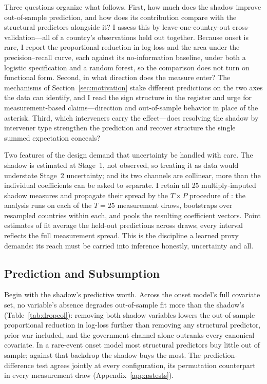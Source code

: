 Three questions organize what follows.  First, how much does the shadow
improve out-of-sample prediction, and how does its contribution compare with
the structural predictors alongside it?  I assess this by leave-one-country-out
cross-validation---all of a country's observations held out
together.  Because onset is rare, I
report the proportional reduction in log-loss and the area under the
precision--recall curve, each against its no-information baseline, under both a
logistic specification and a random forest, so the comparison does not turn on
functional form.  Second, in what direction does the measure enter?  The
mechanisms of Section~\ref{sec:motivation} stake different predictions on the
two axes the data can identify, and I read the sign structure in the register
\citet{gill1999} and \citet{ward2010} urge for measurement-based
claims---direction and out-of-sample behavior in place of the asterisk.  Third,
which interveners carry the effect---does resolving the shadow by intervener
type strengthen the prediction and recover structure the single summed
expectation conceals?

Two features of the design demand that uncertainty be handled with care.  The
shadow is estimated at Stage~1, not observed, so treating it as data would
understate Stage~2 uncertainty; and its two channels are collinear, more than
the individual coefficients can be asked to separate.  I retain all 25
multiply-imputed shadow measures and propagate their spread by the $T \times P$
procedure of \citet{knoxlucascho2022}: the analysis runs on each of the $T = 25$
measurement draws, bootstraps over resampled countries within each, and pools
the resulting coefficient vectors.  Point estimates of fit average the held-out
predictions across draws; every interval reflects the full measurement spread.  This is
the discipline a learned proxy demands: its reach must be carried into
inference honestly, uncertainty and all.

\subsection{Prediction and Subsumption}
\label{sec:prediction}

Begin with the shadow's predictive worth.
Across the onset model's full covariate set, no variable's absence degrades
out-of-sample fit more than the shadow's (Table~\ref{tab:dropcol}): removing
both shadow variables lowers the out-of-sample proportional reduction in
log-loss further than removing any structural predictor, prior war included,
and the government channel alone outranks every canonical covariate.  In a
rare-event onset model most structural predictors buy little out of sample;
against that backdrop the shadow buys the most.  The
\citet{mentchhooker2016} prediction-difference test agrees jointly at every
configuration, its permutation counterpart in every measurement draw
(Appendix~\ref{app:pstests}).


